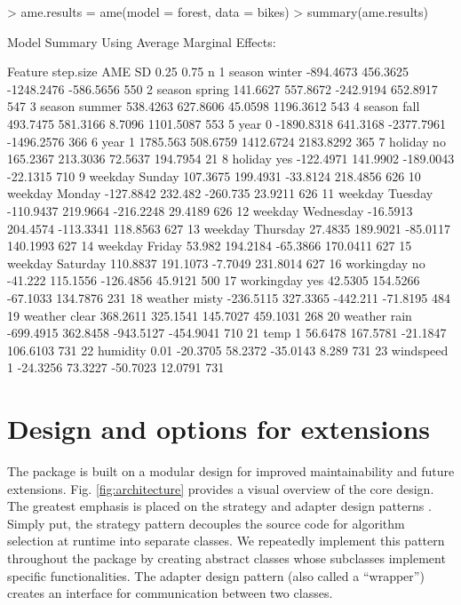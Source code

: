 \begin{example}
> ame.results = ame(model = forest, data = bikes)
> summary(ame.results)
\end{example}
\begin{example}
Model Summary Using Average Marginal Effects:

      Feature step.size        AME       SD       0.25       0.75   n
1      season    winter  -894.4673 456.3625 -1248.2476  -586.5656 550
2      season    spring   141.6627 557.8672  -242.9194   652.8917 547
3      season    summer   538.4263 627.8606    45.0598  1196.3612 543
4      season      fall   493.7475 581.3166     8.7096  1101.5087 553
5        year         0 -1890.8318 641.3168 -2377.7961 -1496.2576 366
6        year         1   1785.563 508.6759  1412.6724  2183.8292 365
7     holiday        no   165.2367 213.3036    72.5637   194.7954  21
8     holiday       yes  -122.4971 141.9902  -189.0043   -22.1315 710
9     weekday    Sunday   107.3675 199.4931   -33.8124   218.4856 626
10    weekday    Monday  -127.8842  232.482   -260.735    23.9211 626
11    weekday   Tuesday  -110.9437 219.9664  -216.2248    29.4189 626
12    weekday Wednesday   -16.5913 204.4574  -113.3341   118.8563 627
13    weekday  Thursday    27.4835 189.9021   -85.0117   140.1993 627
14    weekday    Friday     53.982 194.2184   -65.3866   170.0411 627
15    weekday  Saturday   110.8837 191.1073    -7.7049   231.8014 627
16 workingday        no    -41.222 115.1556  -126.4856    45.9121 500
17 workingday       yes    42.5305 154.5266   -67.1033   134.7876 231
18    weather     misty  -236.5115 327.3365   -442.211   -71.8195 484
19    weather     clear   368.2611 325.1541   145.7027   459.1031 268
20    weather      rain  -699.4915 362.8458  -943.5127  -454.9041 710
21       temp         1    56.6478 167.5781   -21.1847   106.6103 731
22   humidity      0.01   -20.3705  58.2372   -35.0143      8.289 731
23  windspeed         1   -24.3256  73.3227   -50.7023    12.0791 731
\end{example}



\section{Design and options for extensions}
\label{sec:design}


The  package is built on a modular design for improved maintainability and future extensions. Fig. \ref{fig:architecture} provides a visual overview of the core design. The greatest emphasis is placed on the strategy and adapter design patterns \citep{gof_design}. Simply put, the strategy pattern decouples the source code for algorithm selection at runtime into separate classes. We repeatedly implement this pattern throughout the package by creating abstract classes whose subclasses implement specific functionalities. The adapter design pattern (also called a \enquote{wrapper}) creates an interface for communication between two classes.


